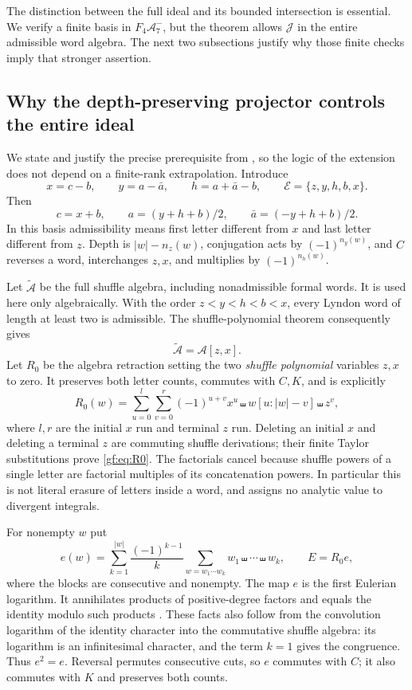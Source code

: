 The distinction between the full ideal and its bounded intersection is
essential. We verify a finite basis in $F_4\mathcal A_7^-$, but the theorem
allows $\mathcal J$ in the entire admissible word algebra. The next two
subsections justify why those finite checks imply that stronger assertion.

\subsection{Why the depth-preserving projector controls the entire ideal}

We state and justify the precise prerequisite from \cite{gf:Depth}, so the
logic of the extension does not depend on a finite-rank extrapolation.
Introduce
\[
 x=c-b,\qquad y=a-\bar a,\qquad h=a+\bar a-b,
 \qquad \mathcal E=\{z,y,h,b,x\}.
\]
Then
\[
 c=x+b,\qquad a=(y+h+b)/2,\qquad
 \bar a=(-y+h+b)/2.
\]
In this basis admissibility means first letter different from $x$ and last
letter different from $z$. Depth is $|w|-n_z(w)$, conjugation acts by
$(-1)^{n_y(w)}$, and $C$ reverses a word, interchanges $z,x$, and
multiplies by $(-1)^{n_h(w)}$.

Let $\widetilde{\mathcal A}$ be the full shuffle algebra, including
nonadmissible formal words. It is used here only algebraically. With the
order $z<y<h<b<x$, every Lyndon word of length at least two is admissible.
The shuffle-polynomial theorem \cite{gf:Radford} consequently gives
\[
 \widetilde{\mathcal A}=\mathcal A[z,x].
\]
Let $R_0$ be the algebra retraction setting the two \emph{shuffle polynomial}
variables $z,x$ to zero. It preserves both letter counts, commutes with
$C,K$, and is explicitly
\begin{equation}
 R_0(w)=\sum_{u=0}^{l}\sum_{v=0}^{r}(-1)^{u+v}
          x^u\shuffle w[u:|w|-v]\shuffle z^v,
 \label{gf:eq:R0}
\end{equation}
where $l,r$ are the initial $x$ run and terminal $z$ run. Deleting an
initial $x$ and deleting a terminal $z$ are commuting shuffle derivations;
their finite Taylor substitutions prove \eqref{gf:eq:R0}. The factorials
cancel because shuffle powers of a single letter are factorial multiples
of its concatenation powers. In particular this is not literal erasure
of letters inside a word, and assigns no analytic value to divergent
integrals.

For nonempty $w$ put
\begin{equation}
 e(w)=\sum_{k=1}^{|w|}\frac{(-1)^{k-1}}k
       \sum_{w=w_1\cdots w_k}w_1\shuffle\cdots\shuffle w_k,
 \qquad E=R_0e,
 \label{gf:eq:E}
\end{equation}
where the blocks are consecutive and nonempty. The map $e$ is the first
Eulerian logarithm. It annihilates products of positive-degree factors and
equals the identity modulo such products \cite{gf:Patras}. These facts
also follow from the convolution logarithm of the identity character
into the commutative shuffle algebra: its logarithm is an infinitesimal
character, and the term $k=1$ gives the congruence. Thus $e^2=e$.
Reversal permutes consecutive cuts, so $e$ commutes with $C$; it also
commutes with $K$ and preserves both counts.

